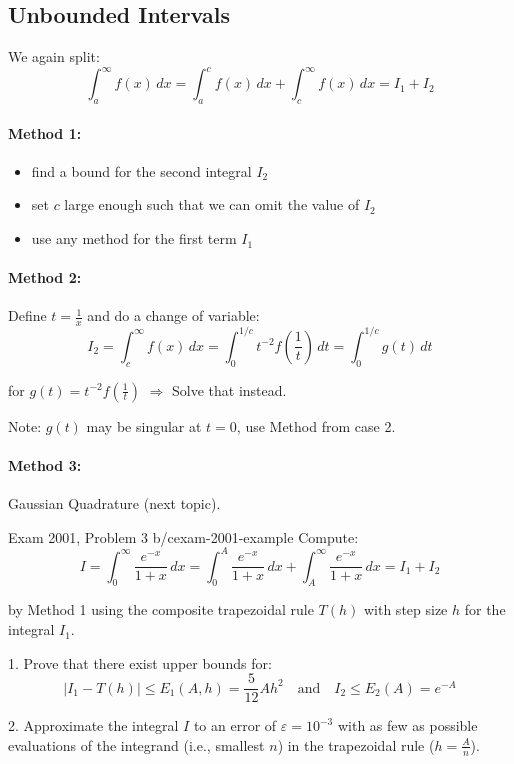 \subsection{Unbounded Intervals}

We again split:
\[\int_a^{\infty} f(x) \, dx = \int_a^c f(x) \, dx + \int_c^{\infty} f(x) \, dx = I_1 + I_2\]

\paragraph{Method 1:}
\begin{itemize}
    \item find a bound for the second integral $I_2$
    \item set $c$ large enough such that we can omit the value of $I_2$
    \item use any method for the first term $I_1$
\end{itemize}

\paragraph{Method 2:}
Define $t = \frac{1}{x}$ and do a change of variable:
\[I_2 = \int_c^{\infty} f(x) \, dx = \int_0^{1/c} t^{-2} f\left(\frac{1}{t}\right) \, dt = \int_0^{1/c} g(t) \, dt\]

for $g(t) = t^{-2} f\left(\frac{1}{t}\right)$ $\Rightarrow$ Solve that instead.

Note: $g(t)$ may be singular at $t = 0$, use Method from case 2.

\paragraph{Method 3:}
Gaussian Quadrature (next topic).

\begin{example}{Exam 2001, Problem 3 b/c}{exam-2001-example}
Compute:
\[I = \int_0^{\infty} \frac{e^{-x}}{1+x} \, dx = \int_0^A \frac{e^{-x}}{1+x} \, dx + \int_A^{\infty} \frac{e^{-x}}{1+x} \, dx = I_1 + I_2\]

by Method 1 using the composite trapezoidal rule $T(h)$ with step size $h$ for the integral $I_1$.

1. Prove that there exist upper bounds for:
   \[|I_1 - T(h)| \leq E_1(A,h) = \frac{5}{12} Ah^2 \quad \text{and} \quad I_2 \leq E_2(A) = e^{-A}\]

2. Approximate the integral $I$ to an error of $\varepsilon = 10^{-3}$ with as few as possible evaluations of the integrand (i.e., smallest $n$) in the trapezoidal rule ($h = \frac{A}{n}$).
\end{example}
